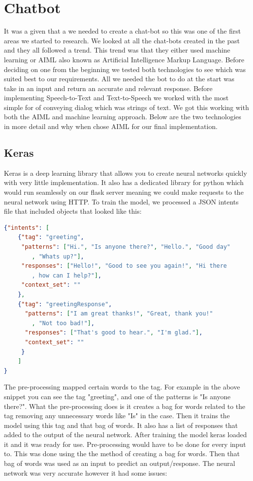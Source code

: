 \section{Chatbot}
It was a given that a we needed to create a chat-bot so this was one of the first areas we started to research. We looked at all the chat-bots created in the past and they all followed a trend. This trend was that they either used machine learning or AIML also known as Artificial Intelligence Markup Language. Before deciding on one from the beginning we tested both technologies to see which was suited best to our requirements. All we needed the bot to do at the start was take in an input and return an accurate and relevant response. Before implementing Speech-to-Text and Text-to-Speech we worked with the most simple for of conveying dialog which was strings of text. We got this working with both the AIML and machine learning approach. Below are the two technologies in more detail and why when chose AIML for our final implementation.

\subsection{Keras}
Keras is a deep learning library that allows you to create neural networks quickly with very little implementation. It also has a dedicated library for python which would run seamlessly on our flask server meaning we could make requests to the neural network using HTTP. To train the model, we processed a JSON intents file that included objects that looked like this:

\begin{lstlisting}[language=JSON]
{"intents": [
    {"tag": "greeting",
     "patterns": ["Hi.", "Is anyone there?", "Hello.", "Good day"
        , "Whats up?"],
     "responses": ["Hello!", "Good to see you again!", "Hi there
        , how can I help?"],
     "context_set": ""
    },
    {"tag": "greetingResponse",
      "patterns": ["I am great thanks!", "Great, thank you!"
        , "Not too bad!"],
      "responses": ["That's good to hear.", "I'm glad."],
      "context_set": ""
     }
    ]
}
\end{lstlisting}

The pre-processing mapped certain words to the tag. For example in the above snippet you can see the tag "greeting", and one of the patterns is "Is anyone there?". What the pre-processing does is it creates a bag for words related to the tag removing any unnecessary words like "Is" in the case. Then it trains the model using this tag and that bag of words. It also has a list of responses that added to the output of the neural network. After training the model keras loaded it and it was ready for use. Pre-processing would have to be done for every input to. This was done using the the method of creating a bag for words. Then that bag of words was used as an input to predict an output/response. The neural network was very accurate however it had some issues:

